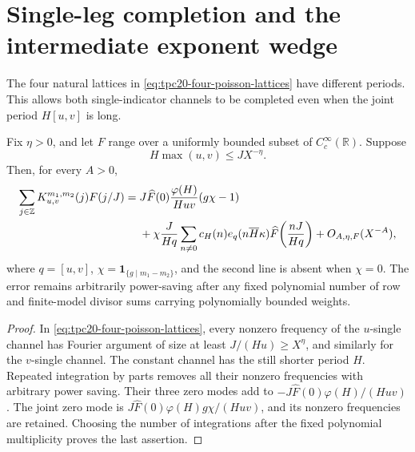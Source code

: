 \section{Single-leg completion and the intermediate exponent wedge}
\label{sec:tpc20-single-leg}

The four natural lattices in
\cref{eq:tpc20-four-poisson-lattices} have different periods.  This
allows both single-indicator channels to be completed even when the joint
period \(H[u,v]\) is long.

\begin{theorem}
\label{thm:tpc20-two-scale-completion}
Fix \(\eta>0\), and let \(F\) range over a uniformly bounded subset of
\(C_c^\infty(\mathbb R)\).  Suppose
\begin{equation}
 H\max(u,v)\le JX^{-\eta}.
 \label{eq:tpc20-single-short-condition}
\end{equation}
Then, for every \(A>0\),
\begin{align}
 \sum_{j\in\mathbb Z}K_{u,v}^{m_1,m_2}(j)F(j/J)
 ={}&J\widehat F(0)\frac{\varphi(H)}{Huv}(g\chi-1)
 \notag\\
 &+\chi\frac{J}{Hq}\sum_{n\ne0}
 c_H(n)e_q(n\overline H\kappa)
 \widehat F\!\left(\frac{nJ}{Hq}\right)
 +O_{A,\eta,F}(X^{-A}),
 \label{eq:tpc20-two-scale-completed}
\end{align}
where \(q=[u,v]\), \(\chi=\mathbf 1_{\{g\mid m_1-m_2\}}\), and the
second line is absent when \(\chi=0\).  The error remains arbitrarily
power-saving after any fixed polynomial number of row and finite-model
divisor sums carrying polynomially bounded weights.
\end{theorem}

\begin{proof}
In \eqref{eq:tpc20-four-poisson-lattices}, every nonzero frequency of
the \(u\)-single channel has Fourier argument of size at least
\(J/(Hu)\ge X^\eta\), and similarly for the \(v\)-single channel.  The
constant channel has the still shorter period \(H\).  Repeated integration
by parts removes all their nonzero frequencies with arbitrary power
saving.  Their three zero modes add to
\(-J\widehat F(0)\varphi(H)/(Huv)\).  The joint zero mode is
\(J\widehat F(0)\varphi(H)g\chi/(Huv)\), and its nonzero frequencies
are retained.  Choosing the number of integrations after the fixed
polynomial multiplicity proves the last assertion.
\end{proof}

